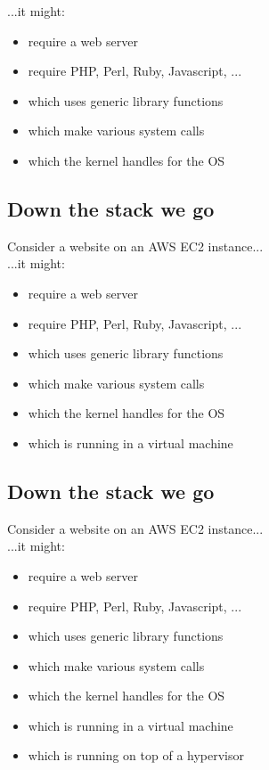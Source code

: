 \documentclass[xga]{xdvislides}
\begin{document}
...it might:

\begin{itemize}
	\item require a web server
	\item require PHP, Perl, Ruby, Javascript, ...
	\item which uses generic library functions
	\item which make various system calls
	\item which the kernel handles for the OS
\end{itemize}

\subsection{Down the stack we go}
Consider a website on an AWS EC2 instance...
\\

...it might:

\begin{itemize}
	\item require a web server
	\item require PHP, Perl, Ruby, Javascript, ...
	\item which uses generic library functions
	\item which make various system calls
	\item which the kernel handles for the OS
	\item which is running in a virtual machine
\end{itemize}

\subsection{Down the stack we go}
Consider a website on an AWS EC2 instance...
\\

...it might:

\begin{itemize}
	\item require a web server
	\item require PHP, Perl, Ruby, Javascript, ...
	\item which uses generic library functions
	\item which make various system calls
	\item which the kernel handles for the OS
	\item which is running in a virtual machine
	\item which is running on top of a hypervisor
\end{itemize}
\end{document}

